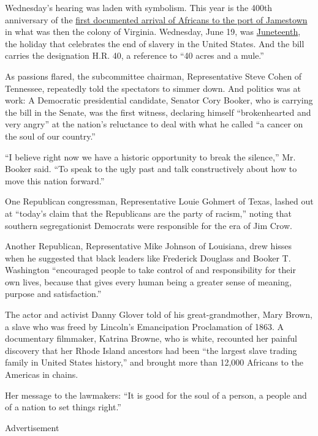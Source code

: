 Wednesday's hearing was laden with symbolism. This year is the 400th
anniversary of the
\href{https://www.nps.gov/jame/learn/historyculture/african-americans-at-jamestown.htm}{first
documented arrival of Africans to the port of Jamestown} in what was
then the colony of Virginia. Wednesday, June 19, was
\href{https://www.nytimes3xbfgragh.onion/aponline/2019/06/14/us/politics/ap-us-ap-explains-juneteenth.html?module=inline}{Juneteenth},
the holiday that celebrates the end of slavery in the United States. And
the bill carries the designation H.R. 40, a reference to ``40 acres and
a mule.''

As passions flared, the subcommittee chairman, Representative Steve
Cohen of Tennessee, repeatedly told the spectators to simmer down. And
politics was at work: A Democratic presidential candidate, Senator Cory
Booker, who is carrying the bill in the Senate, was the first witness,
declaring himself ``brokenhearted and very angry'' at the nation's
reluctance to deal with what he called ``a cancer on the soul of our
country.''

``I believe right now we have a historic opportunity to break the
silence,'' Mr. Booker said. ``To speak to the ugly past and talk
constructively about how to move this nation forward.''

One Republican congressman, Representative Louie Gohmert of Texas,
lashed out at ``today's claim that the Republicans are the party of
racism,'' noting that southern segregationist Democrats were responsible
for the era of Jim Crow.

Another Republican, Representative Mike Johnson of Louisiana, drew
hisses when he suggested that black leaders like Frederick Douglass and
Booker T. Washington ``encouraged people to take control of and
responsibility for their own lives, because that gives every human being
a greater sense of meaning, purpose and satisfaction.''

The actor and activist Danny Glover told of his great-grandmother, Mary
Brown, a slave who was freed by Lincoln's Emancipation Proclamation of
1863. A documentary filmmaker, Katrina Browne, who is white, recounted
her painful discovery that her Rhode Island ancestors had been ``the
largest slave trading family in United States history,'' and brought
more than 12,000 Africans to the Americas in chains.

Her message to the lawmakers: ``It is good for the soul of a person, a
people and of a nation to set things right.''

Advertisement

